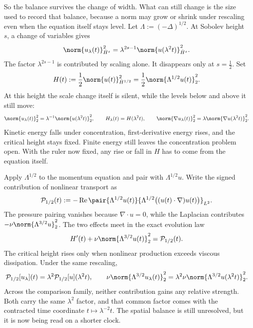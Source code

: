So the balance survives the change of width.
What can still change is the size used to record that balance, because a norm may grow or shrink under rescaling even when the equation itself stays level.
Let \(\Lambda:=(-\Delta)^{1/2}\).
At Sobolev height \(s\), a change of variables gives
\[
  \norm{u_\lambda(t)}_{\dot H^s}^2
  =
  \lambda^{2s-1}
  \norm{u(\lambda^2t)}_{\dot H^s}^2.
\]
The factor \(\lambda^{2s-1}\) is contributed by scaling alone.
It disappears only at \(s=\tfrac12\).
Set
\[
  H(t)
  :=
  \frac12\norm{u(t)}_{\dot H^{1/2}}^2
  =
  \frac12\norm{\Lambda^{1/2}u(t)}_2^2.
\]
At this height the scale change itself is silent, while the levels below and above it still move:
\[
  \norm{u_\lambda(t)}_2^2
  =
  \lambda^{-1}\norm{u(\lambda^2t)}_2^2,
  \qquad
  H_\lambda(t)=H(\lambda^2t),
  \qquad
  \norm{\nabla u_\lambda(t)}_2^2
  =
  \lambda\norm{\nabla u(\lambda^2t)}_2^2.
\]
Kinetic energy falls under concentration, first-derivative energy rises, and the critical height stays fixed.
Finite energy still leaves the concentration problem open.
With the ruler now fixed, any rise or fall in \(H\) has to come from the equation itself.


Apply \(\Lambda^{1/2}\) to the momentum equation and pair with \(\Lambda^{1/2}u\).
Write the signed contribution of nonlinear transport as
\[
  \mathcal P_{1/2}(t)
  :=
  -\operatorname{Re}
  \pair
    {\Lambda^{1/2}u(t)}
    {\Lambda^{1/2}\bigl((u(t)\cdot\nabla)u(t)\bigr)}_{L^2}.
\]
The pressure pairing vanishes because \(\nabla\cdot u=0\), while the Laplacian contributes \(-\nu\norm{\Lambda^{3/2}u}_2^2\).
The two effects meet in the exact evolution law
\[
  H'(t)
  +
  \nu\norm{\Lambda^{3/2}u(t)}_2^2
  =
  \mathcal P_{1/2}(t).
\]
The critical height rises only when nonlinear production exceeds viscous dissipation.
Under the same rescaling,
\[
  \mathcal P_{1/2}[u_\lambda](t)
  =
  \lambda^2\mathcal P_{1/2}[u](\lambda^2t),
  \qquad
  \nu\norm{\Lambda^{3/2}u_\lambda(t)}_2^2
  =
  \lambda^2\nu\norm{\Lambda^{3/2}u(\lambda^2t)}_2^2.
\]
Across the comparison family, neither contribution gains any relative strength.
Both carry the same \(\lambda^2\) factor, and that common factor comes with the contracted time coordinate \(t\mapsto\lambda^{-2}t\).
The spatial balance is still unresolved, but it is now being read on a shorter clock.


